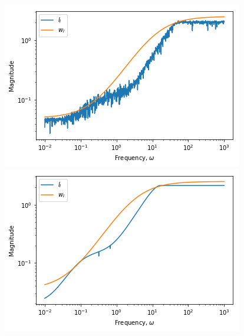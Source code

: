 \begin{figure}[H]
	\centering
	\begin{minipage}{.48\textwidth}
		\centering
		\includegraphics[width=\linewidth]{Figures/Uncertainty_wI_22}
	\end{minipage}%
	\hfill
	\begin{minipage}{.48\textwidth}
		\centering
		\includegraphics[width=\linewidth]{Figures/Uncertainty_wI_23}
	\end{minipage}
\end{figure}

